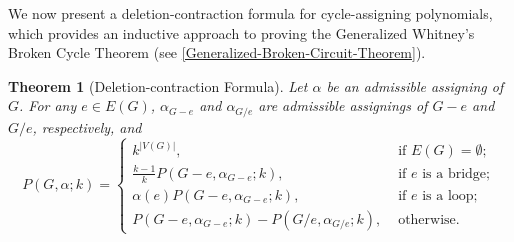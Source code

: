 \documentclass[12pt]{article}%
\numberwithin{equation}{section}
\newtheorem{theorem}{Theorem}[section]
\begin{document}
We now present a deletion-contraction formula for cycle-assigning polynomials, which provides an inductive approach to proving the Generalized Whitney's Broken Cycle Theorem (see \autoref{Generalized-Broken-Circuit-Theorem}).
\begin{theorem}[Deletion-contraction Formula]\label{DCF}
Let $\alpha$ be an admissible assigning of $G$. For any $e\in E(G)$,  $\alpha_{G-e}$ and $\alpha_{G/e}$ are admissible assignings of $G-e$ and $G/e$, respectively, and 
\[
P(G,\alpha;k)=
\begin{cases}
k^{|V(G)|},&\mbox{ if } E(G)=\emptyset;\\
\frac{k-1}{k}P(G-e, \alpha_{G-e};k),& \mbox{ if } e \mbox{ is a bridge};\\
\alpha(e)P(G-e, \alpha_{G-e};k),& \mbox{ if } e \mbox{ is a loop};\\
P(G-e, \alpha_{G-e};k)-P(G/e, \alpha_{G/e};k),& \mbox{ otherwise}.
\end{cases}
\]
\end{theorem}
\end{document}
